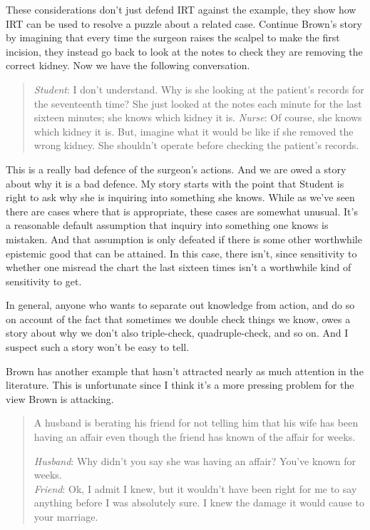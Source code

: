 \documentclass[
  12pt,
  letterpaper,
]{scrbook}
\begin{document}
These considerations don't just defend IRT against the example, they
show how IRT can be used to resolve a puzzle about a related case.
Continue Brown's story by imagining that every time the surgeon raises
the scalpel to make the first incision, they instead go back to look at
the notes to check they are removing the correct kidney. Now we have the
following conversation.

\begin{quote}
\emph{Student}: I don't understand. Why is she looking at the patient's
records for the seventeenth time? She just looked at the notes each
minute for the last sixteen minutes; she knows which kidney it is.
\emph{Nurse}: Of course, she knows which kidney it is. But, imagine what
it would be like if she removed the wrong kidney. She shouldn't operate
before checking the patient's records.
\end{quote}

This is a really bad defence of the surgeon's actions. And we are owed a
story about why it is a bad defence. My story starts with the point that
Student is right to ask why she is inquiring into something she knows.
While as we've seen there are cases where that is appropriate, these
cases are somewhat unusual. It's a reasonable default assumption that
inquiry into something one knows is mistaken. And that assumption is
only defeated if there is some other worthwhile epistemic good that can
be attained. In this case, there isn't, since sensitivity to whether one
misread the chart the last sixteen times isn't a worthwhile kind of
sensitivity to get.

In general, anyone who wants to separate out knowledge from action, and
do so on account of the fact that sometimes we double check things we
know, owes a story about why we don't also triple-check,
quadruple-check, and so on. And I suspect such a story won't be easy to
tell.

Brown has another example that hasn't attracted nearly as much attention
in the literature. This is unfortunate since I think it's a more
pressing problem for the view Brown is attacking.

\begin{quote}
A husband is berating his friend for not telling him that his wife has
been having an affair even though the friend has known of the affair for
weeks.

\emph{Husband}: Why didn't you say she was having an affair? You've
known for weeks.\\
\emph{Friend}: Ok, I admit I knew, but it wouldn't have been right for
me to say anything before I was absolutely sure. I knew the damage it
would cause to your marriage.
\end{quote}
\end{document}
